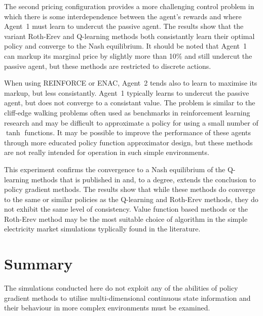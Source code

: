 The second pricing configuration provides a more challenging control problem in
which there is some interdependence between the agent's rewards and where
Agent~1 must learn to undercut the passive agent.  The results show that the
variant Roth-Erev and Q-learning methods both consistantly learn their optimal
policy and converge to the Nash equilibrium.  It should be noted that Agent~1
can markup its marginal price by slightly more than 10\% and still undercut
the passive agent, but these methods are restricted to discrete actions.

When using REINFORCE or ENAC, Agent~2 tends also to learn to maximise its
markup, but less consistantly.  Agent~1 typically learns to undercut the
passive agent, but does not converge to a consistant value.  The problem is
similar to the cliff-edge walking problems often used as benchmarks in
reinforcement learning research and may be difficult to approximate a policy
for using a small number of $\tanh$ functions. It may be possible to improve
the performance of these agents through more educated policy function
approximator design, but these methods are not really intended for operation in
such simple environments.

This experiment confirms the convergence to a Nash equilibrium of the
Q-learning methods that is published in  and, to a degree,
extends the conclusion to policy gradient methods.  The results show that
while these methods do converge to the same or similar policies as the
Q-learning and Roth-Erev methods, they do not exhibit the same level of
consistency.  Value function based methods or the Roth-Erev method may be the
most suitable choice of algorithm in the simple electricity market simulations
typlically found in the literature.

\section{Summary}
The simulations conducted here do not exploit any of
the abilities of policy gradient methods to utilise multi-dimensional
continuous state information and their behaviour in more complex environments
must be examined.



